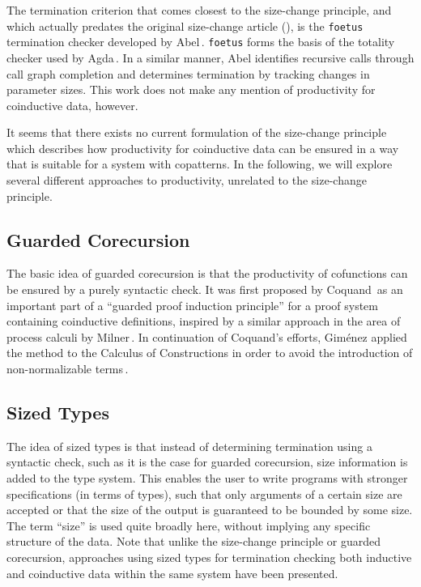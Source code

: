 The termination criterion that comes closest to the size-change principle, and which actually predates the original size-change article (\citep{LeeJones01SizeChange}), is the \texttt{foetus} termination checker developed by Abel\,\citep{Abel98foetus}. \texttt{foetus} forms the basis of the totality checker used by Agda\,\citep{Norell:thesis}. In a similar manner, Abel identifies recursive calls through call graph completion and determines termination by tracking changes in parameter sizes. This work does not make any mention of productivity for coinductive data, however.

It seems that there exists no current formulation of the size-change principle which describes how productivity for coinductive data can be ensured in a way that is suitable for a system with copatterns. In the following, we will explore several different approaches to productivity, unrelated to the size-change principle.

\subsection{Guarded Corecursion}
The basic idea of guarded corecursion is that the productivity of cofunctions can be ensured by a purely syntactic check. It was first proposed by Coquand\,\citep{Coquand94} as an important part of a ``guarded proof induction principle'' for a proof system containing coinductive definitions, inspired by a similar approach in the area of process calculi by Milner\,\citep{Milner82}. In continuation of Coquand's efforts, Gim\'{e}nez applied the method to the Calculus of Constructions in order to avoid the introduction of non-normalizable terms\,\citep{Gimenez95}. 

\citep{Telford97ensuringstreams}
\citep{Telford:jucs_6_4:ensuring_termination_in_esfp} 


\subsection{Sized Types}
The idea of sized types is that instead of determining termination using a syntactic check, such as it is the case for guarded corecursion, size information is added to the type system. This enables the user to write programs with stronger specifications (in terms of types), such that only  arguments of a certain size are accepted or that the size of the output is guaranteed to be bounded by some size. The term ``size'' is used quite broadly here, without implying any specific structure of the data. Note that unlike the size-change principle or guarded corecursion, approaches using sized types for termination checking both inductive and coinductive data within the same system have been presented.

